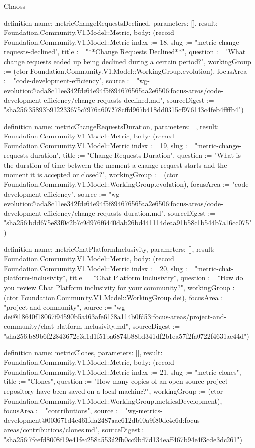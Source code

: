 \begin{lexlean}{Chaoss}
\begin{semanticmodule}
definition{
  name: metricChangeRequestsDeclined,
  parameters: [],
  result: Foundation.Community.V1.Model::Metric,
  body: (record Foundation.Community.V1.Model::Metric {index := 18, slug := "metric-change-requests-declined", title := "**Change Requests Declined**", question := "What change requests ended up being declined during a certain period?", workingGroup := (ctor Foundation.Community.V1.Model::WorkingGroup.evolution), focusArea := "code-development-efficiency", source := "wg-evolution@ada8c11ee342fdc64e94f5f894676565aa2e6506:focus-areas/code-development-efficiency/change-requests-declined.md", sourceDigest := "sha256:35893b912233675c7976a607278cffd967b418dd0315cf976143c4feb4ffffb4"})
}

definition{
  name: metricChangeRequestsDuration,
  parameters: [],
  result: Foundation.Community.V1.Model::Metric,
  body: (record Foundation.Community.V1.Model::Metric {index := 19, slug := "metric-change-requests-duration", title := "Change Requests Duration", question := "What is the duration of time between the moment a change request starts and the moment it is accepted or closed?", workingGroup := (ctor Foundation.Community.V1.Model::WorkingGroup.evolution), focusArea := "code-development-efficiency", source := "wg-evolution@ada8c11ee342fdc64e94f5f894676565aa2e6506:focus-areas/code-development-efficiency/change-requests-duration.md", sourceDigest := "sha256:bdd675e83f0c2b7c9d976f6440dab26bd441114deaa91b58c1b544b7a16cc075"})
}

definition{
  name: metricChatPlatformInclusivity,
  parameters: [],
  result: Foundation.Community.V1.Model::Metric,
  body: (record Foundation.Community.V1.Model::Metric {index := 20, slug := "metric-chat-platform-inclusivity", title := "Chat Platform Inclusivity", question := "How do you review Chat Platform inclusivity for your community?", workingGroup := (ctor Foundation.Community.V1.Model::WorkingGroup.dei), focusArea := "project-and-community", source := "wg-dei@18640f18067f94590b5a463afe6138a114b0fd53:focus-areas/project-and-community/chat-platform-inclusivity.md", sourceDigest := "sha256:b89b6f22843672c3a1d1f51ba6874b88bd341df2b1ea57f2fa0722f4631ae44d"})
}

definition{
  name: metricClones,
  parameters: [],
  result: Foundation.Community.V1.Model::Metric,
  body: (record Foundation.Community.V1.Model::Metric {index := 21, slug := "metric-clones", title := "Clones", question := "How many copies of an open source project repository have been saved on a local machine?", workingGroup := (ctor Foundation.Community.V1.Model::WorkingGroup.metricsDevelopment), focusArea := "contributions", source := "wg-metrics-development@003671d4c461fda2487aae612db00a9f80de4e6d:focus-areas/contributions/clones.md", sourceDigest := "sha256:7fcefd8008f19e41fec258a553d2fb0cc9bd7d134eaff467b94e4f3cde3dc261"})
}


\end{semanticmodule}
\end{lexlean}
